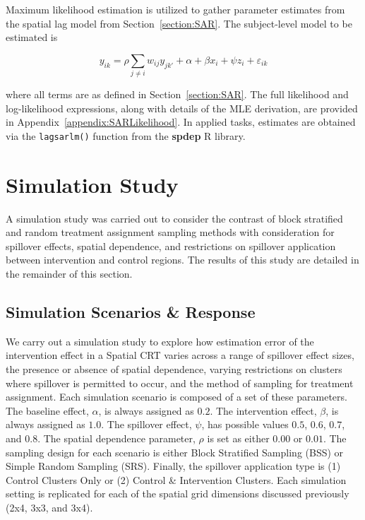 \documentclass{article}[11pt]
\begin{document}
Maximum likelihood estimation is utilized to gather parameter estimates from the spatial lag model from Section~\ref{section:SAR}\cite{ord_estimation_1975}\cite{bivand_comparing_2015}\cite{bivand_computing_2013}. The subject-level model to be estimated is

\begin{equation}\label{Equation:SARestimation}
    y_{ik} = \rho \sum_{j\neq i}w_{ij}y_{jk'} + \alpha + \beta x_i + \psi z_i + \varepsilon_{ik}
\end{equation}

where all terms are as defined in Section~\ref{section:SAR}. The full likelihood and log-likelihood expressions, along with details of the MLE derivation, are provided in Appendix~\ref{appendix:SARLikelihood}. In applied tasks, estimates are obtained via the \texttt{lagsarlm()} function from the \textbf{spdep} R library\cite{bivand_r_2022}.

\section{Simulation Study}\label{section:Results}

A simulation study was carried out to consider the contrast of block stratified and random treatment assignment sampling methods with consideration for spillover effects, spatial dependence, and restrictions on spillover application between intervention and control regions. The results of this study are detailed in the remainder of this section.

\subsection{Simulation Scenarios \& Response}

We carry out a simulation study to explore how estimation error of the intervention effect in a Spatial CRT varies across a range of spillover effect sizes, the presence or absence of spatial dependence, varying restrictions on clusters where spillover is permitted to occur, and the method of sampling for treatment assignment. Each simulation scenario is composed of a set of these parameters. The baseline effect, $\alpha$, is always assigned as $0.2$. The intervention effect, $\beta$, is always assigned as $1.0$. The spillover effect, $\psi$, has possible values $0.5$, $0.6$, $0.7$, and $0.8$. The spatial dependence parameter, $\rho$ is set as either $0.00$ or $0.01$. The sampling design for each scenario is either Block Stratified Sampling (BSS) or Simple Random Sampling (SRS). Finally, the spillover application type is (1) Control Clusters Only or (2) Control \& Intervention Clusters. Each simulation setting is replicated for each of the spatial grid dimensions discussed previously (2x4, 3x3, and 3x4).
\end{document}
